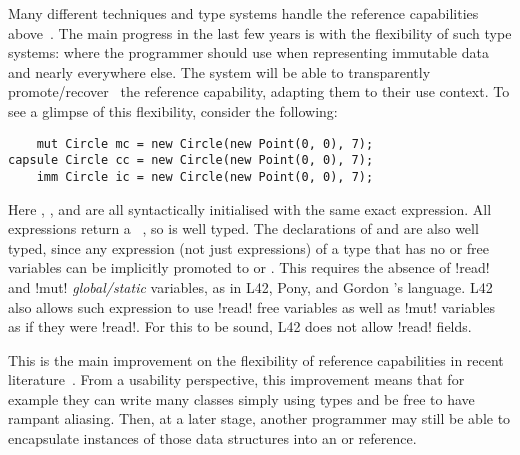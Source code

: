 \noindent Many different techniques and type systems handle the reference capabilities above~\cite{ZibinEtAl10,ClarkeWrigstad03,HallerOdersky10,GordonEtAl12,ServettoZucca15}.
The main progress in the last few years is with the flexibility of such type systems:
 where the programmer should use \Q@imm@ when  representing immutable data
and \Q@mut@ nearly everywhere else. The system will be able to transparently promote/recover~\cite{GordonEtAl12,clebsch2015deny,ServettoZucca15} the reference capability, adapting them to their use context.
To see a glimpse of this flexibility, consider the following:
\begin{lstlisting}
    mut Circle mc = new Circle(new Point(0, 0), 7);
capsule Circle cc = new Circle(new Point(0, 0), 7);
    imm Circle ic = new Circle(new Point(0, 0), 7);
\end{lstlisting}
Here \Q@mc@, \Q@cc@, and \Q@ic@ are all syntactically initialised with the same exact expression. All
\Q@new@ expressions return a \Q@mut@~\cite{clebsch2015deny,GIANNINI2019145}, so \Q@mc@ is well typed. The declarations of \Q@cc@ and \Q@ic@ are also well typed, since 
any expression (not just \Q@new@ expressions) 
of a \Q@mut@ type that has no \Q@mut@ or \Q@read@ free 
variables can be implicitly promoted to \Q@capsule@ or \Q@imm@.
This requires the absence of \Q!read! and \Q!mut! \emph{global/static} variables, as in L42, Pony, and Gordon \etal's language.
L42 also allows such expression to use \Q!read! free variables as well as \Q!mut! variables as if they were \Q!read!. For this to be sound, L42 does not allow \Q!read! fields.

This is the main improvement on the flexibility of reference capabilities in recent literature~\cite{ServettoEtAl13a,ServettoZucca15,GordonEtAl12,clebsch2015deny,clebsch2017orca}.
From a usability perspective, this improvement means that
 for example they can write many classes
simply using \Q@mut@ types and be free to have rampant aliasing. 
Then, at a later stage, another programmer may still 
be able to encapsulate instances of those data structures into an \Q@imm@ or \Q@capsule@ reference.

